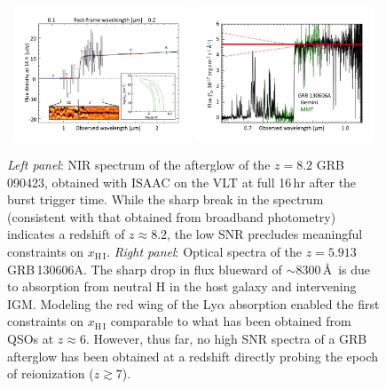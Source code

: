 \documentclass[letterpaper,11pt]{article}
\begin{document}
\begin{figure}[tp!]
\begin{center}
\hbox{
\includegraphics[width=0.47\textwidth]{figures/Slide1.jpg}
\hspace{0.5cm}
\includegraphics[width=0.47\textwidth]{figures/Slide2.jpg}
}
\vspace{-0.9cm}
\end{center}
\caption{\footnotesize
{{\it Left panel}: NIR spectrum of the afterglow of the $z = 8.2$ 
GRB\,090423\cite{tfl+09}, obtained with ISAAC on the VLT at full 16\,hr
after the burst trigger time.  While the sharp break in the spectrum (consistent
with that obtained from broadband photometry) indicates a redshift of $z \approx
8.2$, the low SNR precludes meaningful constraints on $x_{\mathrm{H\,I}}$.
{\it Right panel}: Optical spectra of the $z = 5.913$ 
GRB\,130606A\cite{cbf+13}.  The sharp
drop in flux blueward of $\sim 8300$\,\AA\ is due to absorption from neutral H
in the host galaxy and intervening IGM.  Modeling the red wing of the Ly$\alpha$
absorption enabled the first constraints on $x_{\mathrm{H\,I}}$ 
comparable to what has been obtained
from QSOs at $z \approx 6$.  However, thus far, no high SNR spectra of a GRB
afterglow has been obtained at a redshift directly probing the epoch 
of reionization ($z \gtrsim 7$).}}
\label{fig1}
\end{figure}
\end{document}
